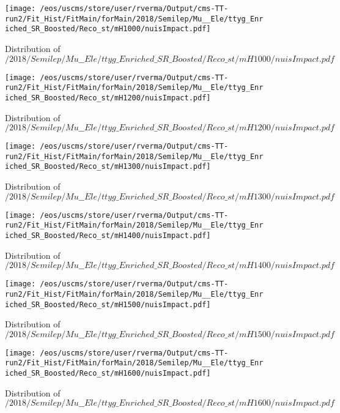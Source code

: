 \begin{figure}
\centering
\texttt{[image: /eos/uscms/store/user/rverma/Output/cms-TT-run2/Fit\_Hist/FitMain/forMain/2018/Semilep/Mu\_\_Ele/ttyg\_Enriched\_SR\_Boosted/Reco\_st/mH1000/nuisImpact.pdf]}
\caption{Distribution of $/2018/Semilep/Mu\_\_Ele/ttyg\_Enriched\_SR\_Boosted/Reco\_st/mH1000/nuisImpact.pdf$}
\end{figure}

\begin{figure}
\centering
\texttt{[image: /eos/uscms/store/user/rverma/Output/cms-TT-run2/Fit\_Hist/FitMain/forMain/2018/Semilep/Mu\_\_Ele/ttyg\_Enriched\_SR\_Boosted/Reco\_st/mH1200/nuisImpact.pdf]}
\caption{Distribution of $/2018/Semilep/Mu\_\_Ele/ttyg\_Enriched\_SR\_Boosted/Reco\_st/mH1200/nuisImpact.pdf$}
\end{figure}

\begin{figure}
\centering
\texttt{[image: /eos/uscms/store/user/rverma/Output/cms-TT-run2/Fit\_Hist/FitMain/forMain/2018/Semilep/Mu\_\_Ele/ttyg\_Enriched\_SR\_Boosted/Reco\_st/mH1300/nuisImpact.pdf]}
\caption{Distribution of $/2018/Semilep/Mu\_\_Ele/ttyg\_Enriched\_SR\_Boosted/Reco\_st/mH1300/nuisImpact.pdf$}
\end{figure}

\begin{figure}
\centering
\texttt{[image: /eos/uscms/store/user/rverma/Output/cms-TT-run2/Fit\_Hist/FitMain/forMain/2018/Semilep/Mu\_\_Ele/ttyg\_Enriched\_SR\_Boosted/Reco\_st/mH1400/nuisImpact.pdf]}
\caption{Distribution of $/2018/Semilep/Mu\_\_Ele/ttyg\_Enriched\_SR\_Boosted/Reco\_st/mH1400/nuisImpact.pdf$}
\end{figure}

\begin{figure}
\centering
\texttt{[image: /eos/uscms/store/user/rverma/Output/cms-TT-run2/Fit\_Hist/FitMain/forMain/2018/Semilep/Mu\_\_Ele/ttyg\_Enriched\_SR\_Boosted/Reco\_st/mH1500/nuisImpact.pdf]}
\caption{Distribution of $/2018/Semilep/Mu\_\_Ele/ttyg\_Enriched\_SR\_Boosted/Reco\_st/mH1500/nuisImpact.pdf$}
\end{figure}

\begin{figure}
\centering
\texttt{[image: /eos/uscms/store/user/rverma/Output/cms-TT-run2/Fit\_Hist/FitMain/forMain/2018/Semilep/Mu\_\_Ele/ttyg\_Enriched\_SR\_Boosted/Reco\_st/mH1600/nuisImpact.pdf]}
\caption{Distribution of $/2018/Semilep/Mu\_\_Ele/ttyg\_Enriched\_SR\_Boosted/Reco\_st/mH1600/nuisImpact.pdf$}
\end{figure}

